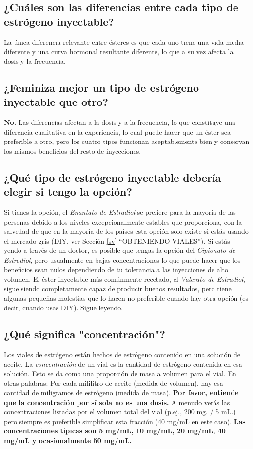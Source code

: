 \documentclass{article}
\begin{document}
\subsection{¿Cuáles son las diferencias entre cada tipo de estrógeno inyectable?}

La única diferencia relevante entre ésteres es que cada uno tiene una vida media diferente y una curva hormonal resultante diferente, lo que a su vez afecta la dosis y la frecuencia.

\subsection{¿Feminiza mejor un tipo de estrógeno inyectable que otro?}

\textbf{No.} Las diferencias afectan a la dosis y a la frecuencia, lo que constituye una diferencia cualitativa en la experiencia, lo cual puede hacer que un éster sea preferible a otro, pero los cuatro tipos funcionan aceptablemente bien y conservan los mismos beneficios del resto de inyecciones.

\subsection{¿Qué tipo de estrógeno inyectable debería elegir si tengo la opción?}

Si tienes la opción, el \textit{Enantato de Estradiol} se prefiere para la mayoría de las personas debido a los niveles excepcionalmente estables que proporciona, con la salvedad de que en la mayoría de los países esta opción solo existe si estás usando el mercado gris (DIY, ver Sección \ref{sv} “OBTENIENDO VIALES”). Si estás yendo a través de un doctor, es posible que tengas la opción del \textit{Cipionato de Estradiol}, pero usualmente en bajas concentraciones lo que puede hacer que los beneficios sean nulos dependiendo de tu tolerancia a las inyecciones de alto volumen. El éster inyectable más comúnmente recetado, el \textit{Valerato de Estradiol}, sigue siendo completamente capaz de producir buenos resultados, pero tiene algunas pequeñas molestias que lo hacen no preferible cuando hay otra opción (es decir, cuando usas DIY). Sigue leyendo.

\subsection{¿Qué significa "concentración"?}

Los viales de estrógeno están hechos de estrógeno contenido en una solución de aceite. La \textit{concentración} de un vial es la cantidad de estrógeno contenida en esa solución. Esto se da como una proporción de masa a volumen para el vial. En otras palabras: Por cada mililitro de aceite (medida de volumen), hay esa cantidad de miligramos de estrógeno (medida de masa). \textbf{Por favor, entiende que la concentración por sí sola no es una dosis.} A menudo verás las concentraciones listadas por el volumen total del vial (p.ej., 200 mg. / 5 mL.) pero siempre es preferible simplificar esta fracción (40 mg/mL en este caso). \textbf{Las concentraciones típicas son 5 mg/mL, 10 mg/mL, 20 mg/mL, 40 mg/mL y ocasionalmente 50 mg/mL.}
\end{document}
